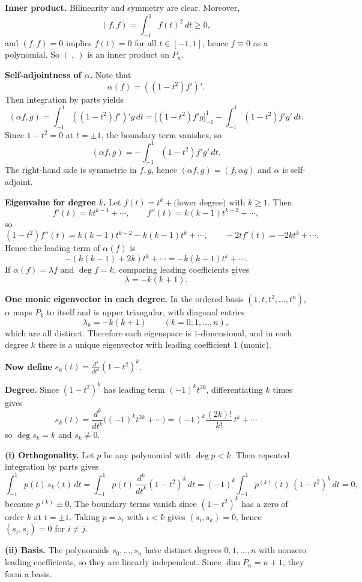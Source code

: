 \begin{solution}
\textbf{Inner product.}
Bilinearity and symmetry are clear. Moreover,
\[
(f,f)=\int_{-1}^{1} f(t)^2\,dt\ge 0,
\]
and $(f,f)=0$ implies $f(t)=0$ for all $t\in[-1,1]$, hence $f\equiv 0$ as a polynomial.
So $(\ ,\ )$ is an inner product on $P_n$.

\textbf{Self-adjointness of $\alpha$.}
Note that
\[
\alpha(f)=((1-t^2)f')'.
\]
Then integration by parts yields
\[
(\alpha f,g)=\int_{-1}^{1} ((1-t^2)f')'g\,dt
=\Big[(1-t^2)f'g\Big]_{-1}^{1}-\int_{-1}^{1}(1-t^2)f'g'\,dt.
\]
Since $1-t^2=0$ at $t=\pm 1$, the boundary term vanishes, so
\[
(\alpha f,g)=-\int_{-1}^{1}(1-t^2)f'g'\,dt.
\]
The right-hand side is symmetric in $f,g$, hence $(\alpha f,g)=(f,\alpha g)$ and $\alpha$ is self-adjoint.

\textbf{Eigenvalue for degree $k$.}
Let $f(t)=t^k+\text{(lower degree)}$ with $k\ge 1$. Then
\[
f'(t)=k t^{k-1}+\cdots,\qquad f''(t)=k(k-1)t^{k-2}+\cdots,
\]
so
\[
(1-t^2)f''(t)=k(k-1)t^{k-2}-k(k-1)t^k+\cdots,\qquad -2t f'(t)=-2k t^k+\cdots.
\]
Hence the leading term of $\alpha(f)$ is
\[
-(k(k-1)+2k)t^k+\cdots=-k(k+1)t^k+\cdots.
\]
If $\alpha(f)=\lambda f$ and $\deg f=k$, comparing leading coefficients gives
\[
\lambda=-k(k+1).
\]

\textbf{One monic eigenvector in each degree.}
In the ordered basis $(1,t,t^2,\dots,t^n)$, $\alpha$ maps $P_k$ to itself and is upper triangular, with diagonal entries
\[
\lambda_k=-k(k+1)\qquad (k=0,1,\dots,n),
\]
which are all distinct. Therefore each eigenspace is $1$-dimensional, and in each degree $k$ there is a unique eigenvector with leading coefficient $1$ (monic).

\textbf{Now define } $s_k(t)=\frac{d^k}{dt^k}(1-t^2)^k$.

\textbf{Degree.} Since $(1-t^2)^k$ has leading term $(-1)^k t^{2k}$, differentiating $k$ times gives
\[
s_k(t) = \frac{d^k}{dt^k}\bigl((-1)^k t^{2k} + \cdots\bigr)
= (-1)^k \frac{(2k)!}{k!}\, t^k + \cdots
\]
so $\deg s_k=k$ and $s_k\neq 0$.

\textbf{(i) Orthogonality.}
Let $p$ be any polynomial with $\deg p<k$. Then repeated integration by parts gives
\[
\int_{-1}^{1} p(t)\,s_k(t)\,dt
=\int_{-1}^{1} p(t)\,\frac{d^k}{dt^k}(1-t^2)^k\,dt
=(-1)^k\int_{-1}^{1} p^{(k)}(t)\,(1-t^2)^k\,dt=0,
\]
because $p^{(k)}\equiv 0$. The boundary terms vanish since $(1-t^2)^k$ has a zero of order $k$ at $t=\pm 1$.
Taking $p=s_i$ with $i<k$ gives $(s_i,s_k)=0$, hence $(s_i,s_j)=0$ for $i\ne j$.

\textbf{(ii) Basis.}
The polynomials $s_0,\dots,s_n$ have distinct degrees $0,1,\dots,n$ with nonzero leading coefficients, so they are linearly independent.
Since $\dim P_n=n+1$, they form a basis.


\end{solution}
